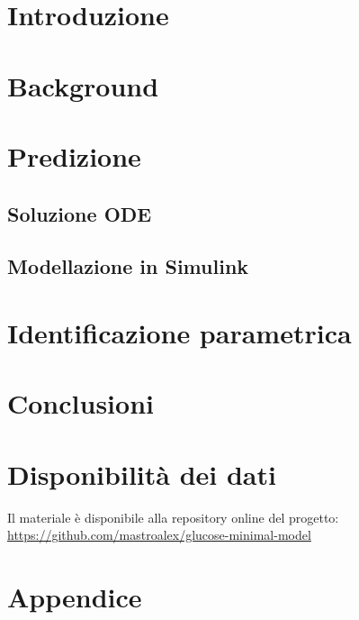 \section{Introduzione}

\textcolor{blue}{\lipsum[1-2]}

\section{Background}
\textcolor{blue}{\lipsum[1-3]}

\section{Predizione}

\textcolor{blue}{\lipsum[1]}

\subsection{Soluzione ODE}
\textcolor{blue}{\lipsum[1-2]}

\subsection{Modellazione in Simulink}

\textcolor{blue}{\lipsum[1-2]}

\section{Identificazione parametrica}

\textcolor{blue}{\lipsum[1-2]}

\section{Conclusioni}

\textcolor{blue}{\lipsum[1]}

\raggedbottom
\section*{Disponibilità dei dati}

Il materiale è disponibile alla repository online del progetto: \url{https://github.com/mastroalex/glucose-minimal-model}


\raggedbottom
\pagebreak
\printbibliography[title=Riferimenti]

\clearpage
\onecolumn
\section*{Appendice}



